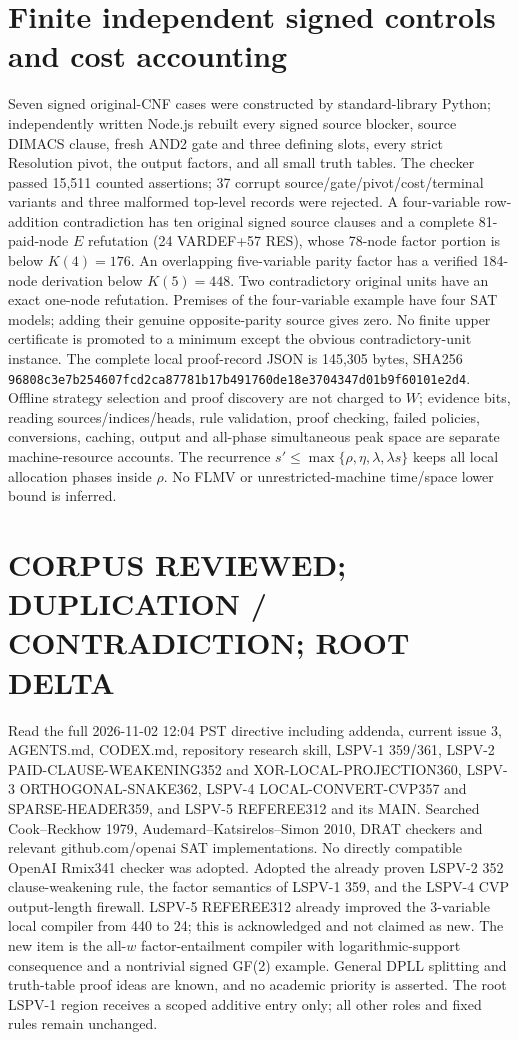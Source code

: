 \documentclass[11pt]{article}
\begin{document}
\section*{Finite independent signed controls and cost accounting}
Seven signed original-CNF cases were constructed by standard-library Python; independently written Node.js rebuilt every signed source blocker, source DIMACS clause, fresh AND2 gate and three defining slots, every strict Resolution pivot, the output factors, and all small truth tables. The checker passed 15,511 counted assertions; 37 corrupt source/gate/pivot/cost/terminal variants and three malformed top-level records were rejected. A four-variable row-addition contradiction has ten original signed source clauses and a complete 81-paid-node $E$ refutation (24 VARDEF+57 RES), whose 78-node factor portion is below $K(4)=176$. An overlapping five-variable parity factor has a verified 184-node derivation below $K(5)=448$. Two contradictory original units have an exact one-node refutation. Premises of the four-variable example have four SAT models; adding their genuine opposite-parity source gives zero. No finite upper certificate is promoted to a minimum except the obvious contradictory-unit instance.
The complete local proof-record JSON is 145,305 bytes, SHA256 \texttt{96808c3e7b254607fcd2ca87781b17b491760de18e3704347d01b9f60101e2d4}. Offline strategy selection and proof discovery are not charged to $W$; evidence bits, reading sources/indices/heads, rule validation, proof checking, failed policies, conversions, caching, output and all-phase simultaneous peak space are separate machine-resource accounts. The recurrence $s'\le\max\{\rho,\eta,\lambda,\lambda s\}$ keeps all local allocation phases inside $\rho$. No FLMV or unrestricted-machine time/space lower bound is inferred.

\section*{CORPUS REVIEWED; DUPLICATION / CONTRADICTION; ROOT DELTA}
Read the full 2026-11-02 12:04 PST directive including addenda, current issue 3, AGENTS.md, CODEX.md, repository research skill, LSPV-1 359/361, LSPV-2 PAID-CLAUSE-WEAKENING352 and XOR-LOCAL-PROJECTION360, LSPV-3 ORTHOGONAL-SNAKE362, LSPV-4 LOCAL-CONVERT-CVP357 and SPARSE-HEADER359, and LSPV-5 REFEREE312 and its MAIN. Searched Cook--Reckhow 1979, Audemard--Katsirelos--Simon 2010, DRAT checkers and relevant github.com/openai SAT implementations. No directly compatible OpenAI Rmix341 checker was adopted.
Adopted the already proven LSPV-2 352 clause-weakening rule, the factor semantics of LSPV-1 359, and the LSPV-4 CVP output-length firewall. LSPV-5 REFEREE312 already improved the 3-variable local compiler from 440 to 24; this is acknowledged and not claimed as new. The new item is the all-$w$ factor-entailment compiler with logarithmic-support consequence and a nontrivial signed GF(2) example. General DPLL splitting and truth-table proof ideas are known, and no academic priority is asserted. The root LSPV-1 region receives a scoped additive entry only; all other roles and fixed rules remain unchanged.
\end{document}
